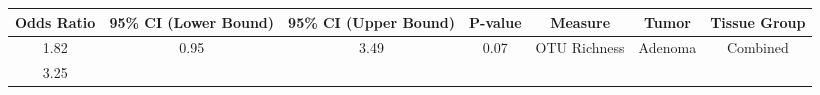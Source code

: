 \documentclass[12pt,]{article}
\begin{document}
\begin{longtable}[]{@{}ccccccc@{}}
\toprule
\begin{minipage}[b]{0.09\columnwidth}\centering\strut
Odds Ratio\strut
\end{minipage} & \begin{minipage}[b]{0.16\columnwidth}\centering\strut
95\% CI (Lower Bound)\strut
\end{minipage} & \begin{minipage}[b]{0.16\columnwidth}\centering\strut
95\% CI (Upper Bound)\strut
\end{minipage} & \begin{minipage}[b]{0.07\columnwidth}\centering\strut
P-value\strut
\end{minipage} & \begin{minipage}[b]{0.14\columnwidth}\centering\strut
Measure\strut
\end{minipage} & \begin{minipage}[b]{0.09\columnwidth}\centering\strut
Tumor\strut
\end{minipage} & \begin{minipage}[b]{0.11\columnwidth}\centering\strut
Tissue Group\strut
\end{minipage}\tabularnewline
\midrule
\endhead
\begin{minipage}[t]{0.09\columnwidth}\centering\strut
1.82\strut
\end{minipage} & \begin{minipage}[t]{0.16\columnwidth}\centering\strut
0.95\strut
\end{minipage} & \begin{minipage}[t]{0.16\columnwidth}\centering\strut
3.49\strut
\end{minipage} & \begin{minipage}[t]{0.07\columnwidth}\centering\strut
0.07\strut
\end{minipage} & \begin{minipage}[t]{0.14\columnwidth}\centering\strut
OTU Richness\strut
\end{minipage} & \begin{minipage}[t]{0.09\columnwidth}\centering\strut
Adenoma\strut
\end{minipage} & \begin{minipage}[t]{0.11\columnwidth}\centering\strut
Combined\strut
\end{minipage}\tabularnewline
\begin{minipage}[t]{0.09\columnwidth}\centering\strut
3.25\strut
\end{minipage} & \begin{minipage}[t]{0.16\columnwidth}\centering\strut

\end{minipage}
\end{longtable}
\end{document}
